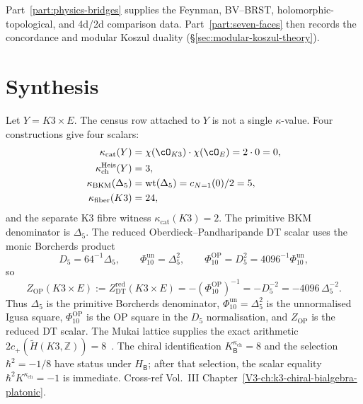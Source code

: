 \medskip

\noindent
Part~\ref{part:physics-bridges} supplies the Feynman, BV--BRST,
holomorphic-topological, and 4d/2d comparison data. Part~\ref{part:seven-faces}
then records the concordance and modular Koszul duality
(\S\ref{sec:modular-koszul-theory}).

\section{Synthesis}
\label{sec:landscape-supplement}

\begin{remark}
\label{rem:landscape-1}
Let $Y=K3\times E$. The census row attached to $Y$ is not a
single $\kappa$-value. Four constructions give four scalars:
\[
 \begin{aligned}
	 \kappa_{\mathrm{cat}}(Y)
	 &= \chi(\cO_{K3})\cdot\chi(\cO_E) = 2\cdot 0 = 0,\\
	 \kappa_{\mathrm{ch}}^{\mathrm{Heis}}(Y)
	 &= 3,\\
	 \kappa_{\mathrm{BKM}}(\Delta_5)
	 &= \mathrm{wt}(\Delta_5)=c_{N=1}(0)/2 = 5,\\
	 \kappa_{\mathrm{fiber}}(K3)
	 &= 24,
	 \end{aligned}
\]
and the separate K3 fibre witness $\kappa_{\mathrm{cat}}(K3)=2$.
The primitive BKM denominator is $\Delta_5$. The reduced
Oberdieck--Pandharipande DT scalar uses the monic Borcherds product
\[
 D_5=64^{-1}\Delta_5,\qquad
 \Phi_{10}^{\mathrm{un}}=\Delta_5^2,\qquad
 \Phi_{10}^{\mathrm{OP}}=D_5^2=4096^{-1}\Phi_{10}^{\mathrm{un}},
\]
so
\[
 Z_{\mathrm{OP}}(K3\times E)
 := Z^{\mathrm{red}}_{\mathrm{DT}}(K3\times E)
 = -(\Phi_{10}^{\mathrm{OP}})^{-1}
 = -D_5^{-2}
 = -4096\,\Delta_5^{-2}.
\]
Thus $\Delta_5$ is the primitive Borcherds denominator,
$\Phi_{10}^{\mathrm{un}}=\Delta_5^2$ is the unnormalised Igusa square,
$\Phi_{10}^{\mathrm{OP}}$ is the OP square in the $D_5$ normalisation,
and $Z_{\mathrm{OP}}$ is the reduced DT scalar.  The Mukai lattice
supplies the exact arithmetic
$2c_+(\widetilde H(K3,\mathbb Z))=8$~\cite{Mukai1987}.  The chiral
identification $K^{\kappa_{\mathrm{ch}}}_{\mathsf B}=8$ and the
selection $\hbar^2=-1/8$ have status \ClaimStatusConjectured under
$H_{\mathsf B}$; after that selection, the scalar equality
$\hbar^2K^{\kappa_{\mathrm{ch}}}=-1$ is immediate.
Cross-ref Vol.~III Chapter~\ref{V3-ch:k3-chiral-bialgebra-platonic}.
\end{remark}

